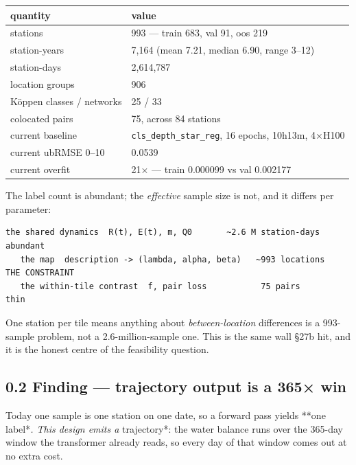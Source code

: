 \documentclass[10pt,a4paper]{article}
\begin{document}
\begin{center}
\small
\begin{tabularx}{\linewidth}{lX}
\toprule
\textbf{quantity} & \textbf{value} \\
\midrule
stations & 993 — train 683, val 91, oos 219 \\
station-years & 7,164 (mean 7.21, median 6.90, range 3–12) \\
station-days & 2,614,787 \\
location groups & 906 \\
Köppen classes / networks & 25 / 33 \\
colocated pairs & 75, across 84 stations \\
current baseline & \texttt{cls\_depth\_star\_reg}, 16 epochs, 10h13m, 4×H100 \\
current ubRMSE 0–10 & 0.0539 \\
current overfit & 21× — train 0.000099 vs val 0.002177 \\
\bottomrule
\end{tabularx}
\end{center}

The label count is abundant; the \emph{effective} sample size is not, and it differs
per parameter:

\begin{Verbatim}[fontsize=\scriptsize,frame=leftline,framerule=0.6pt,rulecolor=\color{rulegray},xleftmargin=6pt,framesep=6pt,]
   the shared dynamics  R(t), E(t), m, Q0       ~2.6 M station-days   abundant
   the map  description -> (lambda, alpha, beta)   ~993 locations     THE CONSTRAINT
   the within-tile contrast  f, pair loss           75 pairs          thin
\end{Verbatim}

One station per tile means anything about \emph{between-location} differences is a
993-sample problem, not a 2.6-million-sample one. This is the same wall §27b
hit, and it is the honest centre of the feasibility question.

\subsection*{0.2 Finding — trajectory output is a 365× win}

Today one sample is one station on one date, so a forward pass yields **one
label*\emph{. This design emits a }trajectory*: the water balance runs over the
365-day window the transformer already reads, so every day of that window comes
out at no extra cost.
\end{document}

